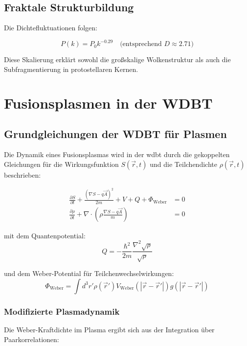 \section{Fraktale Strukturbildung}
Die Dichtefluktuationen folgen:

\begin{equation}
P(k) = P_0 k^{-0.29} \quad \text{(entsprechend } D \approx 2.71\text{)}
\end{equation}

Diese Skalierung erklärt sowohl die großskalige Wolkenstruktur als auch die Subfragmentierung in protostellaren Kernen.

\chapter{Fusionsplasmen in der WDBT}
\section{Grundgleichungen der WDBT für Plasmen}

Die Dynamik eines Fusionsplasmas wird in der \gls{wdbt} durch die gekoppelten Gleichungen für die Wirkungsfunktion $S(\vec{r},t)$ und die Teilchendichte $\rho(\vec{r},t)$ beschrieben:

\begin{align}
\frac{\partial S}{\partial t} + \frac{(\nabla S - q\vec{A})^2}{2m} + V + Q + \Phi_{\text{Weber}} &= 0 \label{eq:B1} \\
\frac{\partial \rho}{\partial t} + \nabla \cdot \left(\rho \frac{\nabla S - q\vec{A}}{m}\right) &= 0 \label{eq:B2}
\end{align}

mit dem Quantenpotential:
\begin{equation}
Q = -\frac{\hbar^2}{2m} \frac{\nabla^2 \sqrt{\rho}}{\sqrt{\rho}} \label{eq:Q}
\end{equation}

und dem Weber-Potential für Teilchenwechselwirkungen:
\begin{equation}
\Phi_{\text{Weber}} = \int d^3r' \rho(\vec{r}') V_{\text{Weber}}(|\vec{r}-\vec{r}'|) g(|\vec{r}-\vec{r}'|)
\end{equation}

\subsection{Modifizierte Plasmadynamik}

Die Weber-Kraftdichte im Plasma ergibt sich aus der Integration über Paarkorrelationen:

